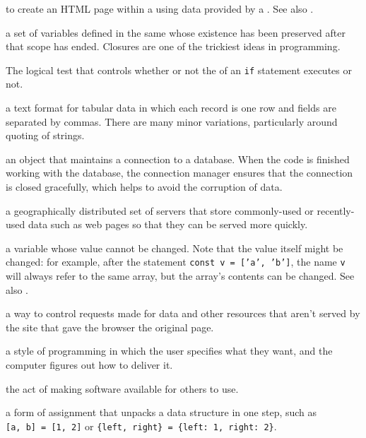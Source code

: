 \begin{description}
to create an HTML page within a  using data provided by a
. See also .

a set of variables defined in the same  whose existence has
been preserved after that scope has ended. Closures are one of the trickiest
ideas in programming.

The logical test that controls whether or not the 
of an \texttt{if} statement executes or not.

a text format for tabular data in which each record is one row and fields are
separated by commas. There are many minor variations, particularly around
quoting of strings.

an object that maintains a connection to a database. When the code is
finished working with the database, the connection manager ensures that the
connection is closed gracefully, which helps to avoid the corruption of data.

a geographically distributed set of servers that store commonly-used or
recently-used data such as web pages so that they can be served more quickly.

a variable whose value cannot be changed. Note that the value itself might be
changed: for example, after the statement \texttt{const\ v\ =\ ['a',\ 'b']}, the name \texttt{v}
will always refer to the same array, but the array's contents can be changed.
See also .

a way to control requests made for data and other resources that aren't served
by the site that gave the browser the original page.

a style of programming in which the user specifies what they want, and the
computer figures out how to deliver it.

the act of making software available for others to use.

a form of assignment that unpacks a data structure in one step, such as \texttt{[a,\ b]\ =\ [1,\ 2]} or \texttt{\{left,\ right\}\ =\ \{left:\ 1,\ right:\ 2\}}.


\end{description}
